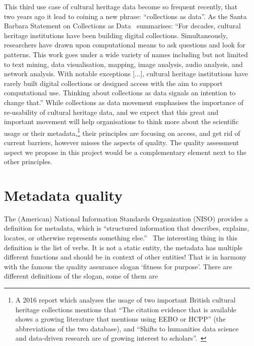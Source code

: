 This third use case of cultural heritage data become so frequent recently, that two years ago it lead to coining a new phrase: ``collections as data''. As the Santa Barbara Statement on Collections as Data~\cite{santabarbarastatement2017} summarises: ``For decades, cultural heritage institutions have been building digital collections. Simultaneously, researchers have drawn upon computational means to ask questions and look for patterns. This work goes under a wide variety of names including but not limited to text mining, data visualisation, mapping, image analysis, audio analysis, and network analysis. With notable exceptions [...], cultural heritage institutions have rarely built digital collections or designed access with the aim to support computational use. Thinking about collections as data signals an intention to change that.'' While collections as data movement emphasises the importance of re-usability of cultural heritage data, and we expect that this great and important movement will help organisations to think more about the scientific usage or their metadata,\footnote{A 2016 report which analyses the usage of two important British cultural heritage collections mentions that ``The citation evidence that is available shows a growing literature that mentions using EEBO or HCPP'' (the abbreviations of the two database), and ``Shifts to humanities data science and data-driven research are of growing interest to scholars''.~\cite{meyer2016}} their principles are focusing on access, and get rid of current barriers, however misses the aspects of quality. The quality assessment aspect we propose in this project would be a complementary element next to the other principles.

\section{Metadata quality}


The (American) National Information Standards Organization (NISO) provides a definition for metadata, which is ``structured information that describes, explains, locates, or otherwise represents something else.''~\cite{framework2007} The interesting thing in this definition is the list of verbs. It is not a static entity, the metadata has multiple different functions and should be in context of other entities! That is in harmony with the famous the quality assurance slogan `fitness for purpose'. There are different definitions of the slogan, some of them are

